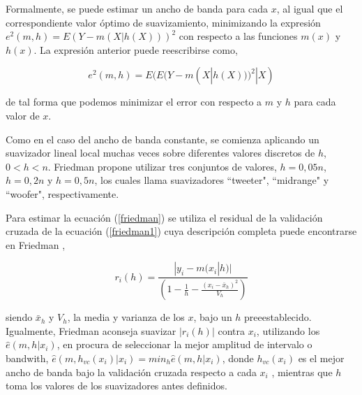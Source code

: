\hspace*{0.4 cm} Formalmente, se puede estimar un ancho de banda para cada $x$, al igual que el correspondiente valor \'optimo de suavizamiento, minimizando la expresi\'on $e^{2}(m,h) = E(Y - m(X|h(X)))^2$ con respecto a las funciones $m(x)$ y $h(x)$. La expresi\'on anterior puede reescribirse como,

\vspace*{0.2 cm}

\begin{equation}
e^{2}(m,h) = E(E(Y - m(X|h(X)))^2|X)
\label{friedman}
\end{equation}

\vspace*{0.2 cm}

\noindent de tal forma que podemos minimizar el error con respecto a $m$ y $h$ para cada valor de $x$.

\hspace*{0.4 cm} Como en el caso del ancho de banda constante, se comienza aplicando un suavizador lineal local muchas veces sobre diferentes valores discretos de $h$, $0 < h < n$. Friedman \cite{F} propone utilizar tres conjuntos de valores, $h=0,05n$, $h=0,2n$ y $h=0,5n$, los cuales llama suavizadores ``tweeter", ``midrange" \hspace*{0.01 cm} y ``woofer", respectivamente.

\hspace*{0.4 cm} Para estimar la ecuaci\'on (\ref{friedman}) se utiliza el residual de la validaci\'on cruzada de la ecuaci\'on (\ref{friedman1}) cuya descripci\'on completa puede encontrarse en Friedman \cite{F},

\vspace*{0.2 cm}

\begin{equation}
 r_{i}(h)= \frac{|y_{i}-m(x_{i}|h)|}{\left(1-\frac{1}{h}-\frac{(x_{i}-\bar{x}_{h})^2}{V_{h}}\right)}  
 \label{friedman1}
\end{equation}

\vspace*{0.2 cm}

\noindent siendo $\bar{x}_{h}$ y $V_{h}$, la media y varianza de los $x$, bajo un $h$ preeestablecido. Igualmente, Friedman \cite{F} aconseja suavizar $|r_{i}(h)|$ contra $x_{i}$, utilizando los $\hat{e}(m, h|x_{i})$, en procura de seleccionar la mejor amplitud de intervalo o bandwith, $\hat{e}(m, h_{vc}(x_{i})|x_{i})=min_{h} \hat{e}(m, h|x_{i})$, donde $h_{vc} (x_{i})$ es el mejor ancho de banda bajo la validaci\'on cruzada respecto a cada $x_{i}$ , mientras que $h$ toma los valores de los suavizadores antes definidos.

